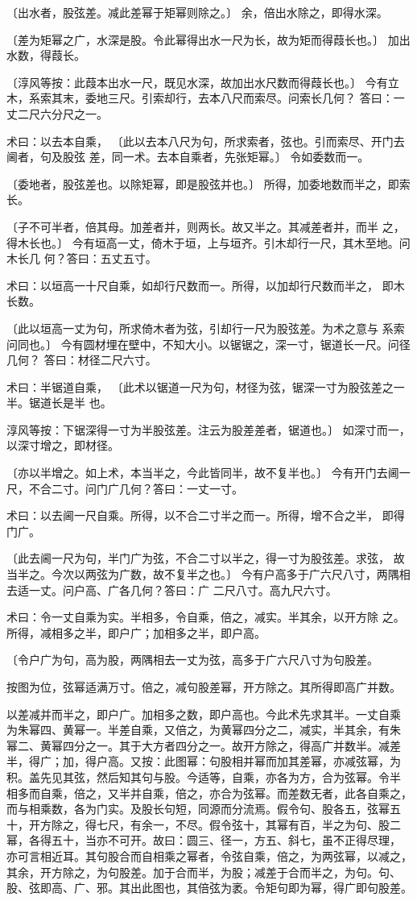 \documentclass[12pt,UTF8]{ctexbook}
\begin{document}
〔出水者，股弦差。减此差幂于矩幂则除之。〕 余，倍出水除之，即得水深。

〔差为矩幂之广，水深是股。令此幂得出水一尺为长，故为矩而得葭长也。〕 加出水数，得葭长。

〔淳风等按：此葭本出水一尺，既见水深，故加出水尺数而得葭长也。〕 今有立木，系索其末，委地三尺。引索却行，去本八尺而索尽。问索长几何？ 答曰：一丈二尺六分尺之一。

术曰：以去本自乘， 〔此以去本八尺为句，所求索者，弦也。引而索尽、开门去阃者，句及股弦 差，同一术。去本自乘者，先张矩幂。〕 令如委数而一。

〔委地者，股弦差也。以除矩幂，即是股弦并也。〕 所得，加委地数而半之，即索长。

〔子不可半者，倍其母。加差者并，则两长。故又半之。其减差者并，而半 之，得木长也。〕 今有垣高一丈，倚木于垣，上与垣齐。引木却行一尺，其木至地。问木长几 何？答曰：五丈五寸。

术曰：以垣高一十尺自乘，如却行尺数而一。所得，以加却行尺数而半之， 即木长数。

〔此以垣高一丈为句，所求倚木者为弦，引却行一尺为股弦差。为术之意与 系索问同也。〕 今有圆材埋在壁中，不知大小。以锯锯之，深一寸，锯道长一尺。问径几何？ 答曰：材径二尺六寸。

术曰：半锯道自乘， 〔此术以锯道一尺为句，材径为弦，锯深一寸为股弦差之一半。锯道长是半 也。

淳风等按：下锯深得一寸为半股弦差。注云为股差差者，锯道也。〕 如深寸而一，以深寸增之，即材径。

〔亦以半增之。如上术，本当半之，今此皆同半，故不复半也。〕 今有开门去阃一尺，不合二寸。问门广几何？答曰：一丈一寸。

术曰：以去阃一尺自乘。所得，以不合二寸半之而一。所得，增不合之半， 即得门广。

〔此去阃一尺为句，半门广为弦，不合二寸以半之，得一寸为股弦差。求弦， 故当半之。今次以两弦为广数，故不复半之也。〕 今有户高多于广六尺八寸，两隅相去适一丈。问户高、广各几何？答曰：广 二尺八寸。高九尺六寸。

术曰：令一丈自乘为实。半相多，令自乘，倍之，减实。半其余，以开方除 之。所得，减相多之半，即户广；加相多之半，即户高。

〔令户广为句，高为股，两隅相去一丈为弦，高多于广六尺八寸为句股差。

按图为位，弦幂适满万寸。倍之，减句股差幂，开方除之。其所得即高广并数。

以差减并而半之，即户广。加相多之数，即户高也。今此术先求其半。一丈自乘 为朱幂四、黄幂一。半差自乘，又倍之，为黄幂四分之二，减实，半其余，有朱 幂二、黄幂四分之一。其于大方者四分之一。故开方除之，得高广并数半。减差 半，得广；加，得户高。又按：此图幂：句股相并幂而加其差幂，亦减弦幂，为 积。盖先见其弦，然后知其句与股。今适等，自乘，亦各为方，合为弦幂。令半 相多而自乘，倍之，又半并自乘，倍之，亦合为弦幂。而差数无者，此各自乘之， 而与相乘数，各为门实。及股长句短，同源而分流焉。假令句、股各五，弦幂五 十，开方除之，得七尺，有余一，不尽。假令弦十，其幂有百，半之为句、股二 幂，各得五十，当亦不可开。故曰：圆三、径一，方五、斜七，虽不正得尽理， 亦可言相近耳。其句股合而自相乘之幂者，令弦自乘，倍之，为两弦幂，以减之， 其余，开方除之，为句股差。加于合而半，为股；减差于合而半之，为句。句、 股、弦即高、广、邪。其出此图也，其倍弦为袤。令矩句即为幂，得广即句股差。
\end{document}
